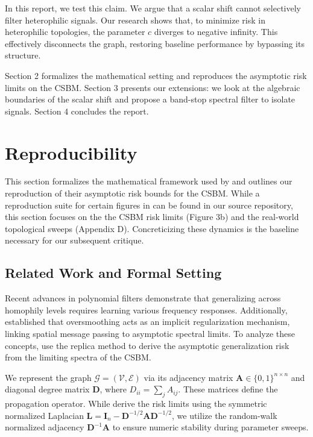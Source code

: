\documentclass[10pt]{article}
\begin{document}
In this report, we test this claim.
We argue that a scalar shift cannot selectively filter heterophilic signals.
Our research shows that, to minimize risk in heterophilic topologies, the parameter $c$ diverges to negative infinity.
This effectively disconnects the graph, restoring baseline performance by bypassing its structure.

Section 2 formalizes the mathematical setting and reproduces the asymptotic risk limits on the CSBM.
Section 3 presents our extensions: we look at the algebraic boundaries of the scalar shift and propose a band-stop spectral filter to isolate signals.
Section 4 concludes the report.


\section{Reproducibility}
This section formalizes the mathematical framework used by \textcite{shi2024} and outlines our reproduction of their asymptotic risk bounds for the CSBM.
While a reproduction suite for certain figures in \textcite{shi2024} can be found in our source repository, this section focuses on the the CSBM risk limits (Figure 3b) and the real-world topological sweeps (Appendix D).
Concreticizing these dynamics is the baseline necessary for our subsequent critique.

\subsection{Related Work and Formal Setting}
Recent advances in polynomial filters \parencite{chien2021, he2021} demonstrate that generalizing across homophily levels requires learning various frequency responses.
Additionally, \textcite{oono2020} established that oversmoothing acts as an implicit regularization mechanism, linking spatial message passing to asymptotic spectral limits.
To analyze these concepts, \textcite{shi2024} use the replica method to derive the asymptotic generalization risk from the limiting spectra of the CSBM. 

We represent the graph $\mathcal{G} = (\mathcal{V}, \mathcal{E})$ via its adjacency matrix $\mathbf{A} \in \{0,1\}^{n \times n}$ and diagonal degree matrix $\mathbf{D}$, where $D_{ii} = \sum_j A_{ij}$.
These matrices define the propagation operator.
While \textcite{shi2024} derive the risk limits using the symmetric normalized Laplacian $\mathbf{L} = \mathbf{I}_n - \mathbf{D}^{-1/2}\mathbf{A}\mathbf{D}^{-1/2}$, we utilize the random-walk normalized adjacency $\mathbf{D}^{-1}\mathbf{A}$ to ensure numeric stability during parameter sweeps.
\end{document}
